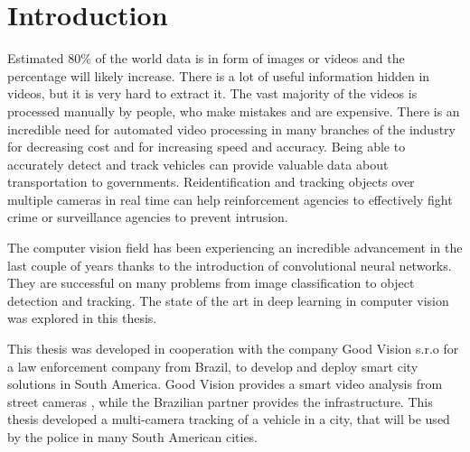 \documentclass[a4paper,11pt,titlepage,twoside]{article}
\numberwithin{figure}{section}
\begin{document}

\pagestyle{empty}
\cleardoublepage


\cleardoublepage


\cleardoublepage


\cleardoublepage



\cleardoublepage

\pagestyle{fancy}
\cfoot{\thepage}

\tableofcontents
\cleardoublepage

\listoffigures
\cleardoublepage

\pagestyle{fancy}
\cfoot{}
\rfoot{\thepage$/$\pageref{LastPage}}
\setlength{\parskip}{0.35cm}

\lhead{\emph{\leftmark}}
\rhead{}

\section{Introduction}
Estimated 80\% of the world data is in form of images or videos \cite{cisco} and the percentage will likely increase. There is a lot of useful information hidden in videos, but it is very hard to extract it. The vast majority of the videos is processed manually by people, who make mistakes and are expensive. There is an incredible need for automated video processing in many branches of the industry for decreasing cost and for increasing speed and accuracy. Being able to accurately detect and track vehicles can provide valuable data about transportation to governments. Reidentification and tracking objects over multiple cameras in real time can help reinforcement agencies to effectively fight crime or surveillance agencies to prevent intrusion. 

The computer vision field has been experiencing an incredible advancement in the last couple of years thanks to the introduction of convolutional neural networks. They are successful on many problems from image classification to object detection and tracking. The state of the art in deep learning in computer vision was explored in this thesis.

This thesis was developed in cooperation with the company Good Vision s.r.o \cite{goodvision} for a law enforcement company from Brazil, to develop and deploy smart city solutions in South America. Good Vision provides a smart video analysis from street cameras , while the Brazilian partner provides the infrastructure. This thesis developed a multi-camera tracking of a vehicle in a city, that will be used by the police in many South American cities. 
\end{document}
